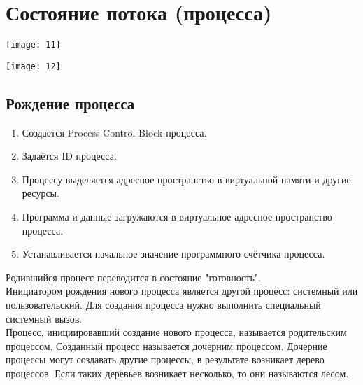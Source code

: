 \documentclass[a4paper]{article}
\begin{document}
\section{Состояние потока (процесса)}
\setcounter{subsection}{0}
\begin{center}
	\texttt{[image: 11]}
\end{center}
\begin{center}
	\texttt{[image: 12]}
\end{center}
\subsection{Рождение процесса}
\begin{enumerate}
        \item Создаётся Process Control Block процесса.
	\item Задаётся ID процесса.
	\item Процессу выделяется адресное пространство в виртуальной памяти и другие ресурсы.
	\item Программа и данные загружаются в виртуальное адресное пространство процесса.
	\item Устанавливается начальное значение программного счётчика процесса.
\end{enumerate}
Родившийся процесс переводится в состояние "готовность".\\
Инициатором рождения нового процесса является другой процесс: системный или пользовательский. Для создания процесса нужно выполнить специальный системный вызов.\\
Процесс, инициировавший создание нового процесса, называется родительским процессом. Созданный процесс называется дочерним процессом. Дочерние процессы могут создавать другие процессы, в результате возникает дерево процессов. Если таких деревьев возникает несколько, то они называются лесом.\\
\end{document}
